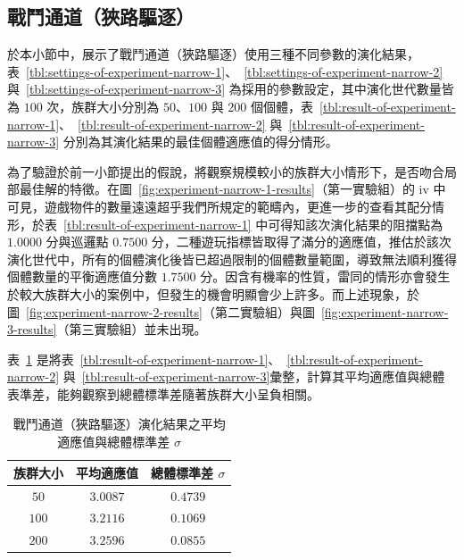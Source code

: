 \clearpage

\subsection{戰鬥通道（狹路驅逐）}
\label{ssec:experiment-results-narrow}

於本小節中，展示了戰鬥通道（狹路驅逐）使用三種不同參數的演化結果，表~\ref{tbl:settings-of-experiment-narrow-1}、~\ref{tbl:settings-of-experiment-narrow-2} 與~\ref{tbl:settings-of-experiment-narrow-3} 為採用的參數設定，其中演化世代數量皆為 $100$ 次，族群大小分別為 $50$、$100$ 與 $200$ 個個體，表~\ref{tbl:result-of-experiment-narrow-1}、~\ref{tbl:result-of-experiment-narrow-2} 與~\ref{tbl:result-of-experiment-narrow-3} 分別為其演化結果的最佳個體適應值的得分情形。

為了驗證於前一小節提出的假說，將觀察規模較小的族群大小情形下，是否吻合局部最佳解的特徵。在圖~\ref{fig:experiment-narrow-1-results}（第一實驗組）的 iv 中可見，遊戲物件的數量遠遠超乎我們所規定的範疇內，更進一步的查看其配分情形，於表~\ref{tbl:result-of-experiment-narrow-1} 中可得知該次演化結果的阻擋點為 $1.0000$ 分與巡邏點 $0.7500$ 分，二種遊玩指標皆取得了滿分的適應值，推估於該次演化世代中，所有的個體演化後皆已超過限制的個體數量範圍，導致無法順利獲得個體數量的平衡適應值分數 $1.7500$ 分。因含有機率的性質，雷同的情形亦會發生於較大族群大小的案例中，但發生的機會明顯會少上許多。而上述現象，於圖~\ref{fig:experiment-narrow-2-results}（第二實驗組）與圖~\ref{fig:experiment-narrow-3-results}（第三實驗組）並未出現。

表~\ref{tbl:result-of-experiment-narrow-avg-sd} 是將表~\ref{tbl:result-of-experiment-narrow-1}、~\ref{tbl:result-of-experiment-narrow-2} 與~\ref{tbl:result-of-experiment-narrow-3}彙整，計算其平均適應值與總體表準差，能夠觀察到總體標準差隨著族群大小呈負相關。

\begin{table}[H]
  \centering
  \caption{戰鬥通道（狹路驅逐）演化結果之平均適應值與總體標準差 $\sigma$}
  \label{tbl:result-of-experiment-narrow-avg-sd}
  \bigskip
  \vspace{-5mm}
  \begin{tabular}[t]{ | c | c | c | }
    \hline
    族群大小 & 平均適應值 & 總體標準差 $\sigma$ \\\hline
    $50$  & $3.0087$ & $0.4739$ \\\hline
    $100$ & $3.2116$ & $0.1069$ \\\hline
    $200$ & $3.2596$ & $0.0855$ \\\hline
  \end{tabular}
\end{table}

